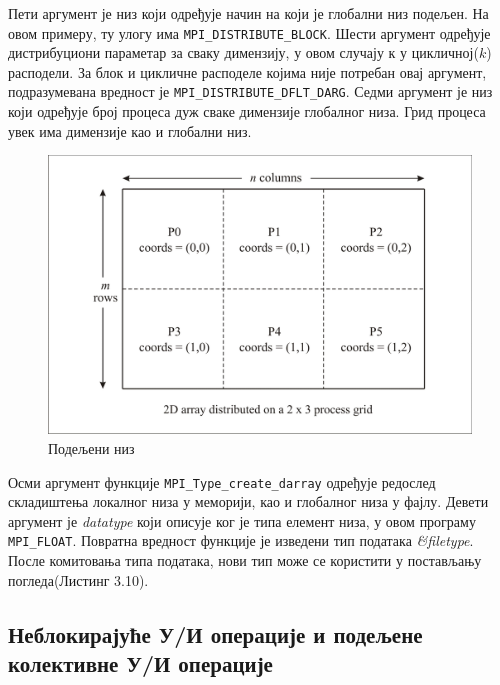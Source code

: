 Пети аргумент је низ који одређује начин на који је глобални низ подељен. На овом примеру, ту улогу има \texttt{MPI\_DISTRIBUTE\_BLOCK}.
Шести аргумент одређује дистрибуциони параметар за сваку димензију, у овом случају $к$ у цикличној($k$) расподели. За блок и цикличне расподеле
којима није потребан овај аргумент, подразумевана вредност је \texttt{MPI\_DISTRIBUTE\_DFLT\_DARG}. Седми аргумент је низ који одређује број процеса дуж сваке димензије глобалног низа. Грид процеса увек има димензије као и глобални низ. 

\begin{figure}[h!]
  \centering
      \includegraphics[width=1\textwidth]{slike/darray.png}
  \caption{Подељени низ}
\end{figure}

Осми аргумент функције \texttt{MPI\_Type\_create\_darray} одређује редослед складиштења локалног низа у меморији, као и глобалног низа у фајлу. Девети аргумент је \textit{datatype} који описује ког је типа елемент низа, у овом програму \texttt{MPI\_FLOAT}. Повратна вредност функције је изведени тип података \textit{\&filetype}. После комитовања типа података, нови тип може се користити у постављању погледа(Листинг 3.10). 


\subsection{Неблокирајуће У/И операције и подељене колективне У/И операције}

